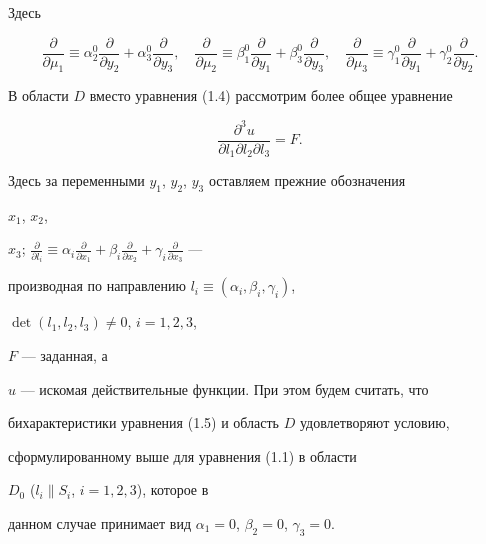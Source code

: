 Здесь


$$


\frac{\partial}{\partial\mu_1}\equiv\alpha^0_2


\frac{\partial}{\partial y_2}+


\alpha^0_3\frac{\partial}{\partial y_3},\quad


%


\frac{\partial}{\partial\mu_2}\equiv\beta^0_1


\frac{\partial}{\partial y_1}+


\beta^0_3\frac{\partial}{\partial y_3},\quad


%


\frac{\partial}{\partial\mu_3}\equiv\gamma^0_1


\frac{\partial}{\partial y_1}+


\gamma^0_2\frac{\partial}{\partial y_2}.


$$





В области $D$ вместо уравнения (1.4) рассмотрим более общее уравнение


\begin{equation}


\frac{\partial^3 u}{\partial l_1\partial l_2\partial l_3}=F.


\end{equation}


Здесь за переменными $y_1$, $y_2$, $y_3$ оставляем прежние обозначения


$x_1$, $x_2$,


$x_3$; $\frac{\partial}{\partial l_i}\equiv\alpha_i


\frac{\partial}{\partial x_1}+\beta_i\frac{\partial}{\partial x_2}+


\gamma_i\frac{\partial}{\partial x_3}$ ---


производная по направлению $l_i\equiv(\alpha_i,\beta_i,\gamma_i)$,


$\det(l_1,l_2,l_3)\ne 0$, $i=1,2,3$,


$F$ --- заданная, а


$u$ --- искомая действительные функции. При этом будем считать, что


бихарактеристики уравнения (1.5) и область $D$ удовлетворяют условию,


сформулированному выше для уравнения (1.1) в области


$D_0$ ($l_i\parallel S_i$, $i=1,2,3$), которое в


данном случае принимает вид $\alpha_1=0$, $\beta_2=0$, $\gamma_3=0$.





